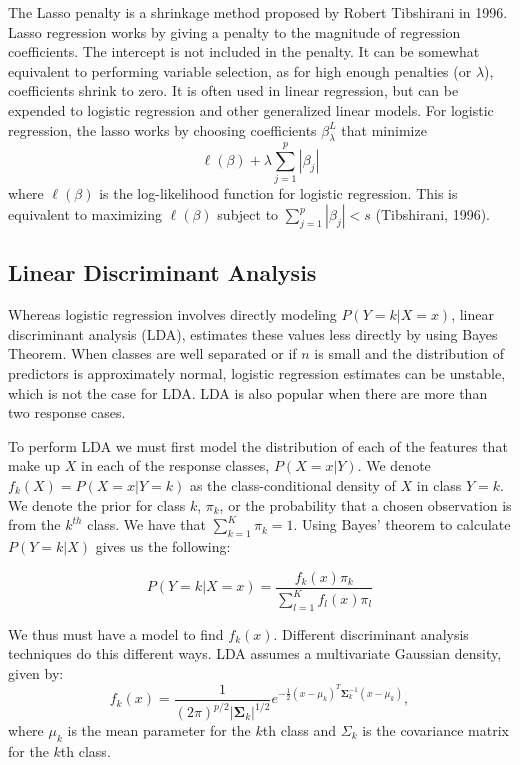 \documentclass[12pt,twoside]{reedthesis}
\theoremstyle{definition}
\theoremstyle{definition}
\theoremstyle{definition}
\theoremstyle{remark}
\begin{document}
The Lasso penalty is a shrinkage method proposed by Robert Tibshirani in
1996. Lasso regression works by giving a penalty to the magnitude of
regression coefficients. The intercept is not included in the penalty.
It can be somewhat equivalent to performing variable selection, as for
high enough penalties (or \(\lambda\)), coefficients shrink to zero. It
is often used in linear regression, but can be expended to logistic
regression and other generalized linear models. For logistic regression,
the lasso works by choosing coefficients \(\beta_\lambda^L\) that
minimize \[ \ell(\beta) + \lambda \sum_{j = 1}^p |\beta_j| \] where
\(\ell(\beta)\) is the log-likelihood function for logistic regression.
This is equivalent to maximizing \(\ell(\beta)\) subject to
\(\sum_{j=1}^p|\beta_j| < s\) (Tibshirani, 1996).

\subsection{Linear Discriminant
Analysis}\label{linear-discriminant-analysis}

Whereas logistic regression involves directly modeling
\(P(Y = k | X =x)\), linear discriminant analysis (LDA), estimates these
values less directly by using Bayes Theorem. When classes are well
separated or if \(n\) is small and the distribution of predictors is
approximately normal, logistic regression estimates can be unstable,
which is not the case for LDA. LDA is also popular when there are more
than two response cases.

To perform LDA we must first model the distribution of each of the
features that make up \(X\) in each of the response classes,
\(P(X = x|Y)\). We denote \(f_k(X) = P(X = x| Y = k)\) as the
class-conditional density of \(X\) in class \(Y = k\). We denote the
prior for class \(k\), \(\pi_k\), or the probability that a chosen
observation is from the \(k^{th}\) class. We have that
\(\sum_{k=1}^K \pi_k = 1\). Using Bayes' theorem to calculate
\(P(Y = k |X)\) gives us the following:

\[ P(Y = k | X = x) = \frac{f_k(x)\pi_k}{\sum_{l = 1}^Kf_l(x)\pi_l}\]

We thus must have a model to find \(f_k(x)\). Different discriminant
analysis techniques do this different ways. LDA assumes a multivariate
Gaussian density, given by:
\[f_k(x) = \frac{1}{(2\pi)^{p/2}|\mathbf{\Sigma}_k|^{1/2}}e^{-\frac{1}{2}(x-\mu_k)^T\mathbf{\Sigma}_k^{-1}(x - \mu_k)},\]
where \(\mu_k\) is the mean parameter for the \(k\)th class and
\(\Sigma_k\) is the covariance matrix for the \(k\)th class.
\end{document}
